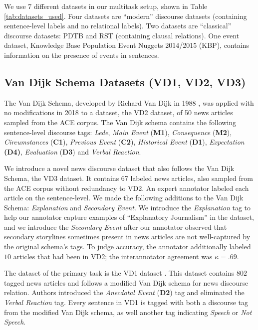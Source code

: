\documentclass[11pt]{article}
\newcommand\nd{VD1\xspace}
\newcommand\fin{VD2\xspace}
\newcommand\spangh{VD3\xspace}
\begin{document}
We use $7$ different datasets in our multitask setup, shown in Table \ref{tab:datasets_used}. Four datasets are ``modern'' discourse datasets (containing sentence-level labels and no relational labels). Two datasets are ``classical'' discourse datasets: PDTB and RST (containing clausal relations). One event dataset, Knowledge Base Population Event Nuggets 2014/2015 (KBP), contains information on the presence of events in sentences.

\subsection{Van Dijk Schema Datasets (\nd, \fin, \spangh)}
The Van Dijk Schema, developed by Richard Van Dijk in 1988 \cite{van2013news}, was applied with no modifications in 2018 \cite{yarlott2018identifying} to a dataset, the \fin dataset, of 50 news articles sampled from the ACE corpus. The Van Dijk schema contains the following sentence-level discourse tags: \textit{Lede},
\textit{Main Event} (\textbf{M1}), \textit{Consequence} (\textbf{M2}), \textit{Circumstances} (\textbf{C1}), \textit{Previous Event} (\textbf{C2}), \textit{Historical Event} (\textbf{D1}), \textit{Expectation} \textbf{(D4)}, \textit{Evaluation} (\textbf{D3}) and \textit{Verbal Reaction}.

We introduce a novel news discourse dataset that also follows the Van Dijk Schema, the \spangh dataset. It contains 67 labeled news articles, also sampled from the ACE corpus without redundancy to \fin. An expert annotator labeled each article on the sentence-level. We made the following additions to the Van Dijk Schema: \textit{Explanation} and \textit{Secondary Event}. We introduce the \textit{Explanation} tag to help our annotator capture examples of ``Explanatory Journalism'' \cite{forde2007discovering} in the dataset, and we introduce the \textit{Secondary Event} after our annotator observed that secondary storylines sometimes present in news articles are not well-captured by the original schema's tags. To judge accuracy, the annotator additionally labeled $10$ articles that had been in \fin; the interannotator agreement was $\kappa = .69$.

The dataset of the primary task is the \nd dataset \cite{choubey-etal-2020-discourse}. This dataset contains $802$ tagged news articles and follows a modified Van Dijk schema for news discourse relation. Authors introduced the \textit{Anecdotal Event} (\textbf{D2}) tag and eliminated the \textit{Verbal Reaction} tag. Every sentence in \nd is tagged with both a discourse tag from the modified Van Dijk schema, as well another tag indicating \textit{Speech} or \textit{Not Speech}.
\end{document}
